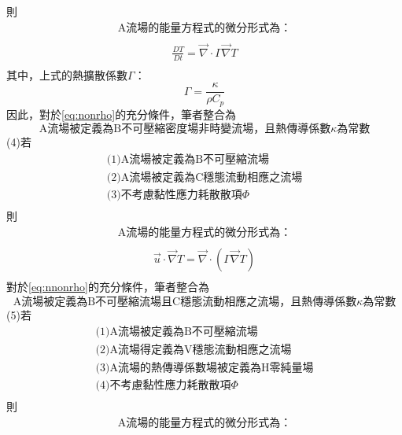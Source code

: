 \documentclass[12pt]{article}
\begin{document}
則
\[\begin{array}{l}
    \text{A流場的能量方程式的微分形式為：}\\[1.5ex]
\end{array}
\]
\begin{equation}\label{eq:nonrho}\begin{split}
    \frac{DT}{Dt} = \vec{\nabla}\cdot \Gamma \vec{\nabla} T \\[1.5ex]
\end{split}\end{equation}
其中，上式的熱擴散係數$\Gamma$：$$\Gamma = \frac{\kappa}{\rho C_p}$$
因此，對於\ref{eq:nonrho}的充分條件，筆者整合為
\begin{equation*}
   \text{A流場被定義為B不可壓縮密度場非時變流場，且熱傳導係數$\kappa$為常數}
\end{equation*}
(4)若
\[\begin{array}{l}
    \text{(1)A流場被定義為B不可壓縮流場}\\[1.5ex]
    \text{(2)A流場被定義為C穩態流動相應之流場}\\[1.5ex]
    \text{(3)不考慮黏性應力耗散散項$\varPhi$}\\[1.5ex]
\end{array}\]
則
\[\begin{array}{l}
    \text{A流場的能量方程式的微分形式為：}\\[1.5ex]
\end{array}
\]
\begin{equation}\label{eq:nnonrho}\begin{split}
    \vec{u}\cdot \vec{\nabla} T = \vec{\nabla}\cdot \left(\Gamma \vec{\nabla} T\right) \\[1.5ex]
\end{split}\end{equation}
對於\ref{eq:nnonrho}的充分條件，筆者整合為
\begin{equation*}
   \text{A流場被定義為B不可壓縮流場且C穩態流動相應之流場，且熱傳導係數$\kappa$為常數}
\end{equation*}
(5)若
\[
\begin{array}{l}
    \text{(1)A流場被定義為B不可壓縮流場}\\[1.5ex]
    \text{(2)A流場得定義為V穩態流動相應之流場}\\[1.5ex]
    \text{(3)A流場的熱傳導係數場被定義為H零純量場}\\[1.5ex]
    \text{(4)不考慮黏性應力耗散散項$\varPhi$}\\[1.5ex]
\end{array}
\]
則
\[\begin{array}{l}
    \text{A流場的能量方程式的微分形式為：}\\[1.5ex]
\end{array}
\]
\end{document}
